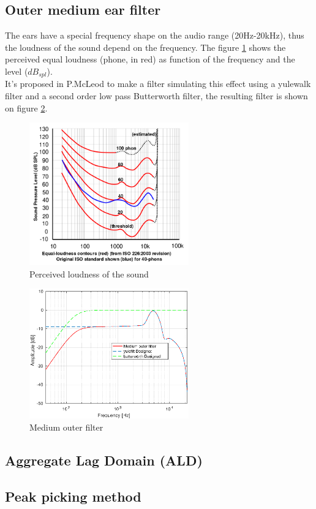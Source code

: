 \documentclass[twoside,twocolumn]{report}
\begin{document}
\subsection{Outer medium ear filter }
The ears have a special frequency shape on the audio range (20Hz-20kHz), thus the loudness of the sound depend on the frequency. The figure \ref{loud} shows the perceived equal loudness (phone, in red) as function of the frequency and the level ($dB_{spl}$).\\
It's proposed in P.McLeod to make a filter simulating this effect using a yulewalk filter and a second order low pass Butterworth filter, the resulting filter is shown on figure \ref{mdouterfilt}.
\begin{figure}[h!]
	\centering
	\includegraphics[width=260px]{./images/loudness.png}
	\caption{Perceived loudness of the sound}
	\label{loud}
\end{figure}
\begin{figure}[h!]
	\centering
	\includegraphics[width=260px]{./images/mdouterfilt.eps}
	\caption{Medium outer filter }
	\label{mdouterfilt}
\end{figure}
\subsection{Aggregate Lag Domain (ALD) }
\subsection{Peak picking method}
\end{document}
